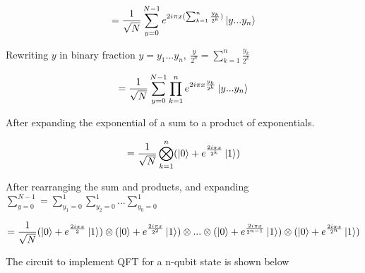 \documentclass{article}
\begin{document}
\vspace{5mm}

\begin{equation}
=  \frac{1}{\sqrt{N}} \sum\limits_{y=0}^{N-1}e^{2i\pi x(\sum_{k=1}^{n}\frac{y_k}{2^k})}\ket{y...y_n} 
\end{equation}
\vspace{5mm}

Rewriting $y$ in binary fraction $y= y_1 ... y_n, \ \frac{y}{2^n} = \sum\limits_{k=1}^{n}\frac{y_k}{2^k}$   
\vspace{5mm}

\begin{equation}
= \frac{1}{\sqrt{N}} \sum\limits_{y=0}^{N-1}\prod\limits_{k=1}^{n}e^{2i\pi x\frac{y_k}{2^k}}\ket{y...y_n}    
\end{equation}
\vspace{5mm}

\noindent
After expanding the exponential of a sum to a product of exponentials.
\vspace{5mm}

\begin{equation}
= \frac{1}{\sqrt{N}}\bigotimes\limits_{k=1}^{n}(\ket{0} + e^{\frac{2i\pi x}{2^k}}\ket{1})  
\end{equation}
\vspace{5mm}

\noindent
After rearranging the sum and products, and expanding $\sum\limits_{y=0}^{N-1} = \sum\limits_{y_1=0}^{1}\sum\limits_{y_2=0}^{1}...\sum\limits_{y_0=0}^{1} $
\vspace{5mm}

\begin{equation}
= \frac{1}{\sqrt{N}}(\ket{0} + e^{\frac{2i\pi x}{2}}\ket{1}) \otimes (\ket{0} + e^{\frac{2i\pi x}{2^2}}\ket{1}) \otimes ... \otimes(\ket{0} + e^{\frac{2i\pi x}{2^{n-1}}}\ket{1}) \otimes (\ket{0} + e^{\frac{2i\pi x}{2^n}}\ket{1})    
\end{equation}
\pagebreak

The circuit to implement QFT for a n-qubit state is shown below
\vspace{5mm}

\noindent
\end{document}
